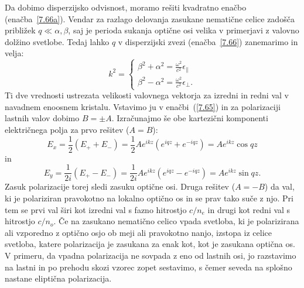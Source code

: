Da dobimo disperzijsko odvisnost, moramo rešiti kvadratno enačbo (enačba~\ref{7.66a}). 
Vendar za razlago delovanja zasukane nematične celice zadošča približek 
$q\ll\alpha, \beta$, saj je perioda sukanja optične osi
velika v primerjavi z valovno dolžino svetlobe. Tedaj lahko $q$ v disperzijski
zvezi (enačba~\ref{7.66}) zanemarimo in velja:
\begin{equation}
k^{2}=
\begin{cases}
\beta^{2}+\alpha^{2}=\frac{\omega^{2}}{c^{2}}\epsilon_{\parallel}\\
\beta^{2}-\alpha^{2}=\frac{\omega^{2}}{c^{2}}\epsilon_{\bot}.
\end{cases}
\label{7.67}
\end{equation}
Ti dve vrednosti ustrezata velikosti valovnega vektorja za izredni
in redni val v navadnem enoosnem kristalu. Vstavimo ju v enačbi~(\ref{7.65})
in za polarizaciji lastnih valov dobimo $B=\pm A$.
Izračunajmo še obe kartezični komponenti električnega polja za prvo rešitev ($A=B$):
\begin{equation}
E_{x} =  \frac{1}{2}(E_{+}+E_{-})  =  \frac{1}{2}Ae^{ikz}(e^{iqz}+e^{-iqz})  =  Ae^{ikz}\cos qz
\end{equation}
in 
\begin{equation}
E_{y} = \frac{1}{2i}(E_{+}-E_{-})  =  \frac{1}{2i}Ae^{ikz}(e^{iqz}-e^{-iqz})  =  Ae^{ikz}\sin qz.
\label{7.68}
\end{equation}
Zasuk polarizacije torej sledi zasuku optične osi. Druga rešitev ($A=-B$) da val,
ki je polariziran pravokotno na lokalno optično os in se prav tako
suče z njo. Pri tem se prvi val širi kot izredni val s fazno hitrostjo $c/n_{e}$ in  
drugi kot redni val s hitrostjo $c/n_{o}$. Če na zasukano
nematično celico vpada svetloba, ki je polarizirana ali vzporedno z 
optično osjo ob meji ali pravokotno nanjo, izstopa iz celice svetloba, katere 
polarizacija je zasukana za enak kot, kot je zasukana optična os. 
V primeru, da vpadna polarizacija ne sovpada z eno od
lastnih osi, jo razstavimo na lastni in po prehodu skozi
vzorec zopet sestavimo, s čemer seveda na splošno nastane eliptična
polarizacija.

